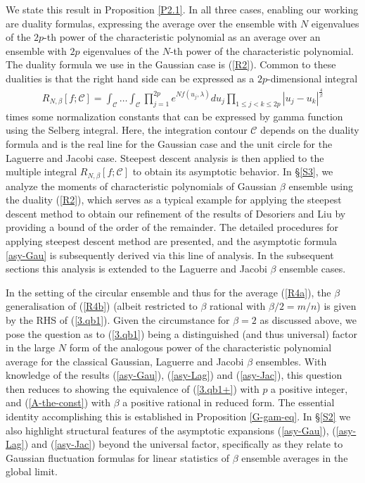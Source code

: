 \documentclass[11pt,a4paper]{article}
\numberwithin{equation}{section} %
\theoremstyle{plain}
\theoremstyle{definition}
\numberwithin{prop}{section}
\numberwithin{cor}{section}
\numberwithin{remark}{section}
\begin{document}
We state this result in Proposition 
\ref{P2.1}. In all three cases, enabling our working are duality formulas,
expressing the average over the ensemble with $N$ eigenvalues of the
 $2p$-th power of the characteristic polynomial as an average over an ensemble with $2p$ eigenvalues of the  $N$-th power of the characteristic polynomial. The duality formula we use in the Gaussian case is (\ref{R2}).
 Common to these dualities is that the right hand side can be 
 expressed as a $2p$-dimensional integral
\begin{align}\label{RN}
    R_{N,\beta}[f;\mathcal{C}]=\int_{\mathcal{C}}\dots\int_{\mathcal{C}}\prod_{j=1}^{2p}e^{Nf(u_j,\lambda)}du_j\prod_{1\leq j<k\leq 2p}|u_j-u_k|^{{\frac{4}{\beta}}}
\end{align}
times some normalization constants that can be expressed by gamma function using the Selberg integral. Here, the integration contour $\mathcal{C}$ depends on the duality formula and is the real line for the Gaussian case and the unit circle for the Laguerre and Jacobi case. Steepest descent analysis \cite{DF06,DL14,DL15} is then applied to the multiple integral $R_{N,\beta}[f;\mathcal{C}]$ to obtain its asymptotic behavior.
In \S \ref{S3}, we analyze the moments of characteristic polynomials of Gaussian $\beta$ ensemble using the duality
(\ref{R2}), which serves as a typical example for applying the steepest descent method to obtain our refinement of the results of Desoriers and Liu \cite{DL14} by providing a bound of the order of the remainder. The detailed procedures for applying steepest descent method are presented, and the asymptotic formula \eqref{asy-Gau} is subsequently derived via this line of analysis. In the subsequent sections this analysis is extended to the Laguerre and Jacobi $\beta$ ensemble cases.

 
 In the setting of the circular ensemble and thus for the average (\ref{R4a}), the $\beta$ generalisation of (\ref{R4b}) 
 (albeit restricted to $\beta$ rational with $\beta/2 = m/n$)
 is given by the RHS of (\ref{3.qb1}). Given the circumstance for $\beta = 2$ as discussed above, we pose the question as to (\ref{3.qb1}) being a distinguished (and thus universal) factor in the large $N$ form of the analogous power of the characteristic polynomial average for the classical Gaussian, Laguerre and Jacobi $\beta$ ensembles. With knowledge of  the results (\ref{asy-Gau}), (\ref{asy-Lag}) and  (\ref{asy-Jac}), this question then reduces to showing the equivalence of (\ref{3.qb1+}) 
 with $p$ a positive integer, and
 (\ref{A-the-const}) with $\beta$ a positive rational in reduced form. The essential identity accomplishing  this is established in Proposition \ref{G-gam-eq}. In \S \ref{S2} we also highlight structural features of the asymptotic
expansions (\ref{asy-Gau}), (\ref{asy-Lag}) and  (\ref{asy-Jac})
beyond the universal factor, specifically as they relate to Gaussian fluctuation formulas for linear statistics of $\beta$ ensemble averages in the global limit.
\end{document}
